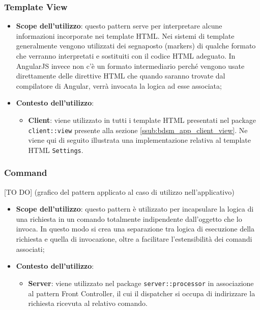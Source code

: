 	\subsubsection{Template View} %
	\label{ssub:template_view}
		\begin{itemize}
			\item \textbf{Scope dell'utilizzo}: questo pattern serve per interpretare alcune informazioni incorporate nei template HTML. Nei sistemi di template generalmente vengono utilizzati dei segnaposto (markers) di qualche formato che verranno interpretati e sostituiti con il codice HTML adeguato. In AngularJS invece non c'è un formato intermediario perché vengono usate direttamente delle direttive HTML che quando saranno trovate dal compilatore di Angular, verrà invocata la logica ad esse associata;
			\item \textbf{Contesto dell'utilizzo}:
				\begin{itemize}
					\item \textbf{Client}: viene utilizzato in tutti i template HTML presentati nel package \texttt{client::view} presente alla sezione \ref{ssub:bdsm_app_client_view}. \newline
					Ne viene qui di seguito illustrata una implementazione relativa al template HTML \texttt{Settings}. \newline
					[TO DO]
				\end{itemize}
		\end{itemize}


	\subsubsection{Command} %
	\label{ssub:command}
	[TO DO] (grafico del pattern applicato al caso di utilizzo nell'applicativo)
		\begin{itemize}
			\item \textbf{Scope dell'utilizzo}: questo pattern è utilizzato per incapsulare la logica di una richiesta in un comando totalmente indipendente dall'oggetto che lo invoca. In questo modo si crea una separazione tra logica di esecuzione della richiesta e quella di invocazione, oltre a facilitare l'estensibilità dei comandi associati;
			\item \textbf{Contesto dell'utilizzo}:
				\begin{itemize}
					\item \textbf{Server}: viene utilizzato nel package \texttt{server::processor} in associazione al pattern Front Controller, il cui il dispatcher si occupa di indirizzare la richiesta ricevuta al relativo comando.
				\end{itemize}
		\end{itemize}
